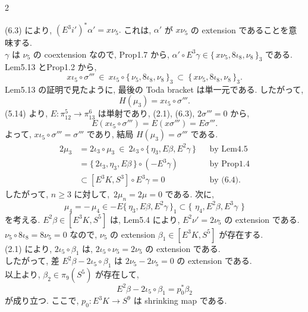 \documentclass[10pt, leqno]{ltjsarticle}
\newcommand{\toda}[1]{\{\,#1\,\}}              %
\newcommand{\todai}[2][]{\{\,#2\,\}_{#1}}      %
\numberwithin{equation}{section}
\theoremstyle{plain}
\theoremstyle{definition}
\theoremstyle{remark}
\begin{document}
\begin{paracol}{2}

\noindent
(6.3) により, 
\((E^3i')^*\alpha' = x\nu_5 .\)
これは, \(\alpha'\) が \(x\nu_5\) 
の extension であることを意味する. \\
\(\gamma\) は \(\nu_5\) の coextension なので, 
Prop1.7 から, 
\(\alpha'\circ E^3\gamma
\in \todai[3]{x\nu_5, 8\iota_8, \nu_8}\) である. \\
Lem5.13 とProp1.2 から,
\[
x\iota_{5}\circ \sigma'''
\ \in\ x\iota_{5}\circ \todai[3]{\nu_{5},8\iota_{8},\nu_{8}}
\ \subset\ \todai[3]{x\nu_{5},8\iota_{8},\nu_{8}} .
\]
Lem5.13 の証明で見たように, 
最後の Toda bracket は単一元である. 
したがって,
\[
H(\mu_{3})=x\iota_{5}\circ \sigma'''.
\]
(5.14) より,
\(E:\pi^{5}_{12}\to \pi^{6}_{13}\) は単射であり, 
(2.1), (6.3), \(2\sigma'''=0\) から,
\[
E(x\iota_{5}\circ \sigma''')
=E(x\sigma''')=E\sigma''' .
\]
よって, \(x\iota_{5}\circ \sigma'''=\sigma'''\) であり, 
結局 \(H(\mu_{3})=\sigma'''\) である. 
\[
\begin{align*}
  2\mu_{3} 
  & = 2\iota_{3}\circ \mu_{3}
  \ \in\ 2\iota_{3}\circ \toda{\eta_{3},E\beta,E^{2}\gamma} 
  && \text{by Lem4.5}\\
  & = \toda{2\iota_{3},\eta_{3},E\beta}\circ (-E^{3}\gamma) 
  && \text{by Prop1.4}\\
  & \subset [E^{3}K, S^{3}]\circ E^{3}\gamma = 0 
  && \text{by (6.4)} .
\end{align*}
\]
したがって, \(n\ge3\) に対して, 
\(\,2\mu_{n}=2\mu=0\) である. 次に,
\[
\mu_{4}=-\,\mu_{4}\in -E\todai[1]{\eta_{3},E\beta,E^{2}\gamma}
\subset \toda{\,\eta_{4},E^{2}\beta,E^{3}\gamma\,}
\]
を考える. 
\(E^{2}\beta\in[E^{3}K, S^{5}]\) は, Lem5.4 により, 
\(E^{2}\nu'=2\nu_{5}\) の extension である. \\
\(\nu_{5}\circ 8\iota_{8}=8\nu_{5}=0\) なので, 
\(\nu_{5}\) の extension  \(\beta_{1}\in[E^{3}K, S^{5}]\) が存在する. \\
(2.1) により, \(2\iota_{5}\circ \beta_{1}\) は,
\(2\iota_{5}\circ \nu_{5}=2\nu_{5}\) の extension である. \\
したがって, 差
\(E^{2}\beta-2\iota_{5}\circ \beta_{1}\) は
\(2\nu_{5}-2\nu_{5}=0\) の extension である. \\
以上より, \(\beta_{2}\in\pi_{9}(S^{5})\) が存在して, 
\[
E^{2}\beta-2\iota_{5}\circ \beta_{1}=p_{0}^{\ast}\beta_{2}
\]
が成り立つ. 
ここで, \(p_{0}:E^{3}K\to S^{9}\) は shrinking map である. 
\begin{equation}\label{eq:6.5}
\begin{align*}

\end{align*}
\end{equation}
\end{paracol}
\end{document}
